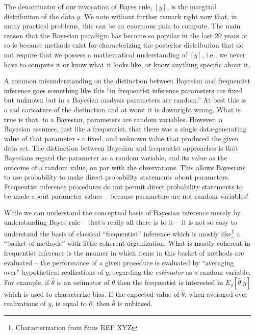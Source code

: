 The denominator of our invocation of Bayes rule, $[y]$,
is the marginal distribution of the data $y$.  We note without further
remark right now that, in many practical problems, this can be an
enormous pain to compute. The main reason that the Bayesian paradigm
has become so popular in the last 20 years or so is because methods
exist for characterizing the posterior distribution that do not
require that we possess a mathematical understanding of $[y]$, i.e.,
we never have to compute it or know what it looks like, or know
anything specific about it.

A common misunderstanding on the distinction between Bayesian and
frequentist inference goes something like this ``in frequentist
inference parameters are fixed but unknown but in a Bayesian analysis
parameters are random.'' At best this is a sad caricature of the
distinction and at worst it is downright wrong. What is true is that,
to a Bayesian, parameters are random variables. However, a Bayesian
assumes, just like a frequentist, that there was a single
data-generating value of that parameter - a fixed, and unknown value
that produced the given data set.
The distinction between Bayesian and frequentist approaches is that
Bayesians regard the parameter as a random variable, and its value as
the outcome of a random value, on par with the observations. This
allows Bayesians to use probability to make direct probability
statements about parameters. Frequentist inference procedures do not
permit direct probability statements to be made about parameter
values -- because parameters are not random variables!

While we can understand the conceptual basis of Bayesian inference
merely by understanding Bayes rule -- that's really all there is to it
-- it is not so easy to understand the basis of classical
``frequentist'' inference which is mostly
like\footnote{Characterization from Sims REF XYZ} a ``basket of
methods'' with little coherent organization. What is mostly coherent
in frequentist inference is the manner in which items in this basket
of methods are evaluated -- the performance of a given procedure is
evaluated by ``averaging over'' hypothetical realizations of $y$,
regarding the {\it estimator} as a random variable. For example, if
$\hat{\theta}$ is an estimator of $\theta$ then the frequentist is
interested in $E_{y}[\hat{\theta}|y]$ which is used to characterize
bias. If the expected value of $\hat{\theta}$, when averaged over
realizations of $y$, is equal to $\theta$, then $\hat{\theta}$ is
unbiased.

